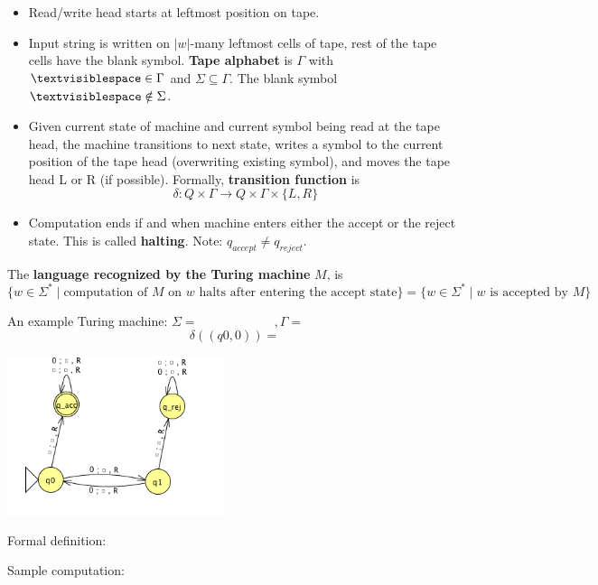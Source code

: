 \documentclass[12pt, oneside]{article}
\begin{document}
\begin{itemize}
\setlength{\itemsep}{0pt}
\item Read/write head starts at leftmost position on tape. 
\item Input string is written on $|w|$-many leftmost cells of tape, 
rest of  the tape cells have  the blank symbol. {\bf Tape alphabet} 
is $\Gamma$ with $\textvisiblespace\in \Gamma$ and $\Sigma \subseteq \Gamma$.
The blank symbol $\textvisiblespace \notin \Sigma$.
\item Given current state of machine and current symbol being read at the tape head, 
the machine transitions to next state, writes a symbol to the current position  of the 
tape  head (overwriting existing symbol), and moves the tape head L or R (if possible). 
Formally, {\bf transition function}  is 
\[
  \delta: Q\times \Gamma \to Q \times \Gamma \times \{L, R\}
\]
\item Computation ends if and when machine enters either the accept or the reject state.
This is called {\bf halting}.
Note: $q_{accept} \neq q_{reject}$.
\end{itemize}

The {\bf language recognized by the  Turing machine} $M$,  is  
\[
  \{ w \in \Sigma^* \mid \textrm{computation of $M$ on $w$ halts after entering the accept state}\} = \{ w \in \Sigma^* \mid w \textrm{ is accepted by } M\}
\]

\newpage
An example Turing machine: $\Sigma = \phantom{\hspace{1in}}, \Gamma = \phantom{\hspace{1in}} $
\[
  \delta ( ( q0, 0)  ) =  
\]

\includegraphics[width=2.5in]{../../resources/machines/Lect13TM1.png}

Formal definition: 


Sample computation: 
\end{document}

